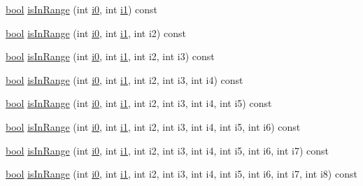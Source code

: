 \begin{DoxyCompactItemize}
\item 
\hyperlink{compiler_8h_abb452686968e48b67397da5f97445f5b}{bool} \hyperlink{classArray_ad00bdc689557a020bb9ccb44a5f629bd}{is\+In\+Range} (int \hyperlink{cephes_8h_aacd2643d920288e61be16787561a4514}{i0}, int \hyperlink{cephes_8h_ab24474d03df1f9adf1700c2c1badd1a5}{i1}) const 
\item 
\hyperlink{compiler_8h_abb452686968e48b67397da5f97445f5b}{bool} \hyperlink{classArray_a89d93d7807d693a6897c91c4f1ad6d43}{is\+In\+Range} (int \hyperlink{cephes_8h_aacd2643d920288e61be16787561a4514}{i0}, int \hyperlink{cephes_8h_ab24474d03df1f9adf1700c2c1badd1a5}{i1}, int i2) const 
\item 
\hyperlink{compiler_8h_abb452686968e48b67397da5f97445f5b}{bool} \hyperlink{classArray_abbd656747a51ffa3dcaf3671ad5c2c54}{is\+In\+Range} (int \hyperlink{cephes_8h_aacd2643d920288e61be16787561a4514}{i0}, int \hyperlink{cephes_8h_ab24474d03df1f9adf1700c2c1badd1a5}{i1}, int i2, int i3) const 
\item 
\hyperlink{compiler_8h_abb452686968e48b67397da5f97445f5b}{bool} \hyperlink{classArray_a72584ead99ac458995622a0143924c0c}{is\+In\+Range} (int \hyperlink{cephes_8h_aacd2643d920288e61be16787561a4514}{i0}, int \hyperlink{cephes_8h_ab24474d03df1f9adf1700c2c1badd1a5}{i1}, int i2, int i3, int i4) const 
\item 
\hyperlink{compiler_8h_abb452686968e48b67397da5f97445f5b}{bool} \hyperlink{classArray_afcf6f542300b7941583ad07c34252efd}{is\+In\+Range} (int \hyperlink{cephes_8h_aacd2643d920288e61be16787561a4514}{i0}, int \hyperlink{cephes_8h_ab24474d03df1f9adf1700c2c1badd1a5}{i1}, int i2, int i3, int i4, int i5) const 
\item 
\hyperlink{compiler_8h_abb452686968e48b67397da5f97445f5b}{bool} \hyperlink{classArray_ac887b928fc20eabcc722801e4981c0b8}{is\+In\+Range} (int \hyperlink{cephes_8h_aacd2643d920288e61be16787561a4514}{i0}, int \hyperlink{cephes_8h_ab24474d03df1f9adf1700c2c1badd1a5}{i1}, int i2, int i3, int i4, int i5, int i6) const 
\item 
\hyperlink{compiler_8h_abb452686968e48b67397da5f97445f5b}{bool} \hyperlink{classArray_a8f4c45c9856d0df38fc44bfa858ef163}{is\+In\+Range} (int \hyperlink{cephes_8h_aacd2643d920288e61be16787561a4514}{i0}, int \hyperlink{cephes_8h_ab24474d03df1f9adf1700c2c1badd1a5}{i1}, int i2, int i3, int i4, int i5, int i6, int i7) const 
\item 
\hyperlink{compiler_8h_abb452686968e48b67397da5f97445f5b}{bool} \hyperlink{classArray_a2266f1badf3bdbb3da86484c95be000d}{is\+In\+Range} (int \hyperlink{cephes_8h_aacd2643d920288e61be16787561a4514}{i0}, int \hyperlink{cephes_8h_ab24474d03df1f9adf1700c2c1badd1a5}{i1}, int i2, int i3, int i4, int i5, int i6, int i7, int i8) const 

\end{DoxyCompactItemize}
